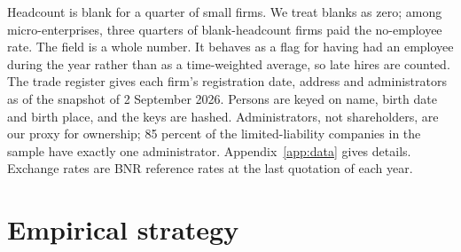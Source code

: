 \documentclass[12pt]{article}
\begin{document}


Headcount is blank for a quarter of small firms. We treat blanks as zero; among micro-enterprises, three quarters of blank-headcount firms paid the no-employee rate. The field is a whole number. It behaves as a flag for having had an employee during the year rather than as a time-weighted average, so late hires are counted. The trade register gives each firm's registration date, address and administrators as of the snapshot of 2 September 2026. Persons are keyed on name, birth date and birth place, and the keys are hashed. Administrators, not shareholders, are our proxy for ownership; 85 percent of the limited-liability companies in the sample have exactly one administrator. Appendix~\ref{app:data} gives details. Exchange rates are BNR reference rates at the last quotation of each year.

\FloatBarrier
\section{Empirical strategy}\label{sec:method}
\end{document}
